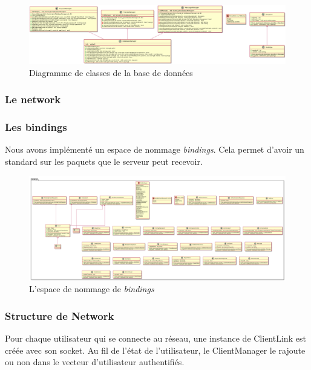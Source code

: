 \documentclass{article}
\begin{document}
\begin{figure}[!ht]
	\centering
	 \includegraphics[scale=0.2]{../res/uml/class/DatabaseClass.png}
	 \caption{Diagramme de classes de la base de données}
	 \label{fig:DatabaseDiagram}
\end{figure}

\subsubsection{Le network}

\subsubsection*{Les bindings}

Nous avons implémenté un espace de nommage \textit{bindings}. Cela permet d'avoir un standard sur les paquets que le serveur peut recevoir.

\begin{figure}[H]
	\centering
	 \includegraphics[scale=0.1, angle=90]{../res/uml/class/BindingClass.png}
	 \caption{L'espace de nommage de \textit{bindings}}
	 \label{fig:BindingDiagram}
\end{figure}

\subsubsection*{Structure de Network}

Pour chaque utilisateur qui se connecte au réseau, une instance de ClientLink est créée avec son socket. Au fil de l'état de l'utilisateur, le ClientManager le rajoute ou non dans le vecteur d'utilisateur authentifiés.
\end{document}
